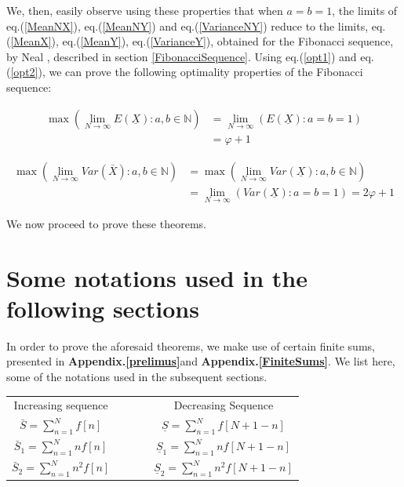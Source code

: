 \begin{multicols}{2}
We, then, easily observe using these properties that when $a = b = 1$, the limits of eq.(\ref{MeanNX}), eq.(\ref{MeanNY}) and eq.(\ref{VarianceNY}) reduce to the limits, eq.(\ref{MeanX}), eq.(\ref{MeanY}), eq.(\ref{VarianceY}), obtained for the Fibonacci sequence, by Neal \cite{art1-key01}, described in section \ref{FibonacciSequence}. Using eq.(\ref{opt1}) and eq.(\ref{opt2}), we can prove the following optimality properties of the Fibonacci sequence:
\begin{thm}
 \label{thm-5}
\begin{align*}
\max{\left(\lim_{N\rightarrow \infty} E(\underline{X}): a, b \in \mathbb N \right)} &= \lim_{N \rightarrow \infty}\left(E(\underline{X}):a=b=1\right)\\
 &= \varphi + 1
\end{align*}
\end{thm}
\begin{thm}
\label{thm-6}
{\fontsize{7.3}{8.3}\selectfont\begin{align*}
\max{\left (\lim_{N\rightarrow \infty}Var(\bar{X}): a,b \in \mathbb N\right)} &=\max{\left(\lim_{N\rightarrow \infty}Var(\underline{X}): a,b \in \mathbb N\right)}\\
&= \lim_{N \rightarrow \infty}\left(Var(\underline{X}):a=b=1\right)= 2\varphi + 1
\end{align*}}
 \end{thm}

\vspace{-.5cm}

We now proceed to prove these theorems.

\vspace{-.5cm}

\section{Some notations used in the\\ following sections}\label{section-5}
In order to prove the aforesaid theorems, we make use of certain finite sums, presented in \textbf{Appendix.\ref{prelimus}}\break and \textbf{Appendix.\ref{FiniteSums}}. We list here, some of the notations used in the subsequent sections.

\begin{tabular}{cccc}
  Increasing sequence & ~ &~& Decreasing Sequence\\[.2cm]
 $\bar{S} = \displaystyle{\sum_{n=1}^{N}}f[n]$& ~ &~& $\underline{S} = \displaystyle{\sum_{n=1}^{N}}f[N+1-n]$ \\
 $\bar{S}_1 = \displaystyle{\sum_{n=1}^{N}}n f[n]$ & ~ &~& $\underline{S}_1 = \displaystyle{\sum_{n=1}^{N}}n f[N+1-n]$ \\
 $\bar{S}_2 = \displaystyle{\sum_{n=1}^{N}}n^2 f[n]$ &~& ~&$\underline{S}_2 = \displaystyle{\sum_{n=1}^{N}}n^2 f[N+1-n]$ 
\end{tabular}


\end{multicols}
